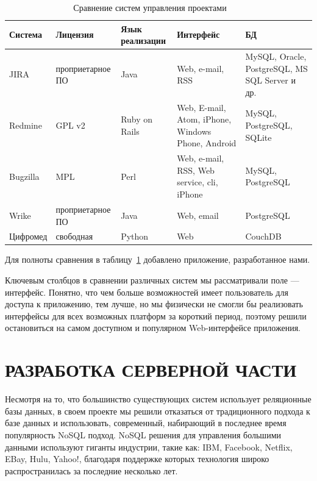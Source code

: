 \documentclass[14pt, a4paper]{extreport}
\begin{document}
\begin{table}[!htb]
  \caption{Сравнение систем управления проектами~\cite{jira_off}~\cite{redmine_off}~\cite{bugzilla_off}~\cite{wrike_off}}
  \label{tab:cmp_pm}
  \begin{center}
    \begin{tabularx}{\textwidth}{|l|X|X|X|X|}
      \hline
      Система & Лицензия & Язык реализации & Интерфейс & БД \\
      \hline
      JIRA & проприетарное ПО & Java & Web, e-mail, RSS & MySQL, Oracle, PostgreSQL, MS SQL Server и др. \\
      \hline
      Redmine & GPL v2 & Ruby on Rails & Web, E-mail, Atom, iPhone, Windows Phone, Android & MySQL, PostgreSQL, SQLite \\
      \hline
      Bugzilla & MPL & Perl & Web, e-mail, RSS, Web service, cli, iPhone & MySQL, PostgreSQL \\
      \hline
      Wrike & проприетарное ПО & Java & Web, email & PostgreSQL \\
      \hline
      Цифромед & свободная & Python & Web & CouchDB \\
      \hline
    \end{tabularx}
  \end{center}
\end{table}

Для полноты сравнения в таблицу~\ref{tab:cmp_pm} добавлено приложение, разработанное нами.

Ключевым столбцов в сравнении различных систем мы рассматривали поле --- интерфейс.
Понятно, что чем больше возможностей имеет пользователь для доступа к приложению, тем лучше,
но мы физически не смогли бы реализовать интерфейсы для всех возможных платформ за короткий период,
поэтому решили остановиться на самом доступном и популярном Web-интерфейсе приложения.

\chapter{\MakeTextUppercase{Разработка серверной части}}
Несмотря на то, что большинство существующих систем использует реляционные
базы данных, в своем проекте мы решили отказаться от традиционного подхода
к базе данных и использовать, современный, набирающий в последнее время популярность
NoSQL подход. NoSQL решения для управления большими данными используют гиганты индустрии,
такие как: IBM, Facebook, Netflix, EBay, Hulu, Yahoo!, благодаря поддержке которых технология
широко распространилась за последние несколько лет.
\end{document}
